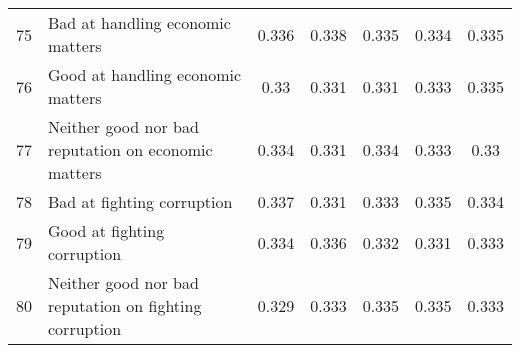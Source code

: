 \begin{longtable}{lp{7cm}ccccc}
  75 & Bad at handling economic matters & 0.336 & 0.338 & 0.335 & 0.334 & 0.335 \\ 
  76 & Good at handling economic matters & 0.33 & 0.331 & 0.331 & 0.333 & 0.335 \\ 
  77 & Neither good nor bad reputation on economic matters & 0.334 & 0.331 & 0.334 & 0.333 & 0.33 \\ 
  78 & Bad at fighting corruption & 0.337 & 0.331 & 0.333 & 0.335 & 0.334 \\ 
  79 & Good at fighting corruption & 0.334 & 0.336 & 0.332 & 0.331 & 0.333 \\ 
  80 & Neither good nor bad reputation on fighting corruption & 0.329 & 0.333 & 0.335 & 0.335 & 0.333 \\ 
   \bottomrule
\end{longtable}
